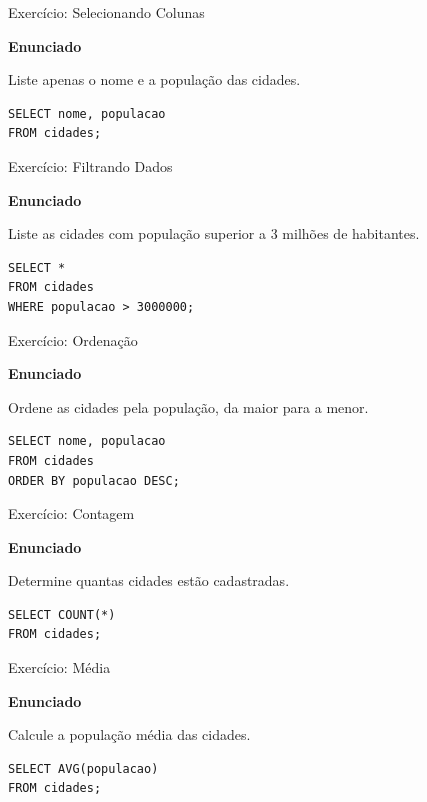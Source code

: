 \documentclass{beamer}
\begin{document}
\begin{frame}[fragile]{Exercício: Selecionando Colunas}

\textbf{Enunciado}

Liste apenas o nome e a população das cidades.
\pause
\begin{verbatim}
SELECT nome, populacao
FROM cidades;
\end{verbatim}

\end{frame}

\begin{frame}[fragile]{Exercício: Filtrando Dados}

\textbf{Enunciado}

Liste as cidades com população superior a 3 milhões de habitantes.
\pause
\begin{verbatim}
SELECT *
FROM cidades
WHERE populacao > 3000000;
\end{verbatim}

\end{frame}

\begin{frame}[fragile]{Exercício: Ordenação}

\textbf{Enunciado}

Ordene as cidades pela população, da maior para a menor.
\pause
\begin{verbatim}
SELECT nome, populacao
FROM cidades
ORDER BY populacao DESC;
\end{verbatim}

\end{frame}

\begin{frame}[fragile]{Exercício: Contagem}

\textbf{Enunciado}

Determine quantas cidades estão cadastradas.
\pause
\begin{verbatim}
SELECT COUNT(*)
FROM cidades;
\end{verbatim}

\end{frame}

\begin{frame}[fragile]{Exercício: Média}

\textbf{Enunciado}

Calcule a população média das cidades.
\pause
\begin{verbatim}
SELECT AVG(populacao)
FROM cidades;
\end{verbatim}

\end{frame}
\end{document}
